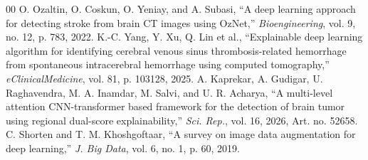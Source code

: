 \documentclass[conference]{IEEEtran}
\begin{document}
{\begin{thebibliography}{00}
 O. Ozaltin, O. Coskun, O. Yeniay, and A. Subasi, ``A deep learning approach for detecting stroke from brain CT images using OzNet,'' \emph{Bioengineering}, vol. 9, no. 12, p. 783, 2022.
 K.-C. Yang, Y. Xu, Q. Lin et al., ``Explainable deep learning algorithm for identifying cerebral venous sinus thrombosis-related hemorrhage from spontaneous intracerebral hemorrhage using computed tomography,'' \emph{eClinicalMedicine}, vol. 81, p. 103128, 2025.
 A. Kaprekar, A. Gudigar, U. Raghavendra, M. A. Inamdar, M. Salvi, and U. R. Acharya, ``A multi-level attention CNN-transformer based framework for the detection of brain tumor using regional dual-score explainability,'' \emph{Sci. Rep.}, vol. 16, 2026, Art. no. 52658.
 C. Shorten and T. M. Khoshgoftaar, ``A survey on image data augmentation for deep learning,'' \emph{J. Big Data}, vol. 6, no. 1, p. 60, 2019.
\end{thebibliography}
}
\end{document}
